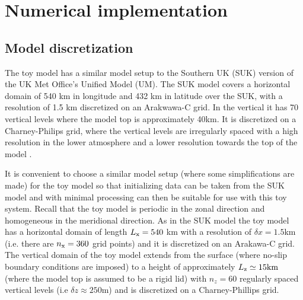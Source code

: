 \documentclass[times]{qjrms4}
\begin{document}
\section{Numerical implementation} \label{numerical_implementation}

\subsection{Model discretization}

The toy model has a similar model setup to the Southern UK (SUK) version of the UK Met Office's 
Unified Model (UM).  
The SUK model covers a horizontal domain of 540 km in longitude and 432 km in latitude over the SUK, 
with a resolution of 1.5 km discretized on an Arakwawa-C grid. 
In the vertical it has 70 vertical levels where the model top is approximately 40km. It is discretized
on a Charney-Philips grid, where the vertical levels are irregularly spaced with a 
high resolution in the lower atmosphere and a lower resolution towards the top of the model \citep{lean_2008}.

It is convenient to choose a similar model setup (where some simplifications are made) 
for the toy model so that initializing data can be taken
from the SUK model and with minimal processing can then be suitable for use with this toy system. 
Recall that the toy model is periodic in the zonal direction and homogeneous in the 
meridional direction.  
As in the SUK model the toy model has a horizontal domain of length $L_{\rm x} = 540$ km with a
resolution of $\delta x = 1.5 $km (i.e. there are $n_{\rm x} = 360$ grid points) and it is 
discretized on an Arakawa-C grid. 
The vertical domain of the toy model extends from the surface (where no-slip boundary conditions are
imposed) to a height of approximately $L_{\rm z} \simeq 15 \rm{km}$ (where the model top is assumed
to be a rigid lid) with $n_z = 60$ regularly spaced vertical levels 
(i.e $\delta z \approx 250$m) and is discretized on a Charney-Phillips grid. 
\end{document}
